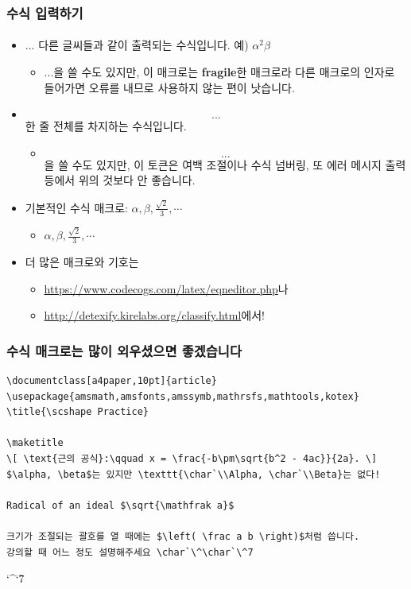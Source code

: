   \begin{frame}[fragile]
    \frametitle{수식 입력하기}
    \framesubtitle{}
    \begin{itemize}
      \item \texttt{$ ... $} 다른 글씨들과 같이 출력되는 수식입니다. 예) $\alpha^2\beta$
      \begin{itemize}
        \item \texttt{\( ... \)}을 쓸 수도 있지만, 이 매크로는 \textbf{fragile}한 매크로라 다른 매크로의 인자로 들어가면 오류를 내므로 사용하지 않는 편이 낫습니다.
      \end{itemize}
      \item \texttt{\[ ... \]} 한 줄 전체를 차지하는 수식입니다.
      \begin{itemize}
        \item \texttt{$$ ... $$}을 쓸 수도 있지만, 이 토큰은 여백 조절이나 수식 넘버링, 또 에러 메시지 출력 등에서 위의 것보다 안 좋습니다.
      \end{itemize}
      \item 기본적인 수식 매크로: \texttt{$ \alpha, \beta, \frac{\sqrt{2}}{3}, \cdots $}
      \begin{itemize}
        \item $ \alpha, \beta, \frac{\sqrt{2}}{3}, \cdots $
      \end{itemize}
      \item 더 많은 매크로와 기호는
      \begin{itemize}
        \item \url{https://www.codecogs.com/latex/eqneditor.php}나 
        \item \url{http://detexify.kirelabs.org/classify.html}에서!
      \end{itemize}
    \end{itemize}
  \end{frame}
  
  \begin{frame}[fragile]
    \frametitle{수식 매크로는 많이 외우셨으면 좋겠습니다}
    \begin{verbatim}
\documentclass[a4paper,10pt]{article}
\usepackage{amsmath,amsfonts,amssymb,mathrsfs,mathtools,kotex}
\title{\scshape Practice}

\maketitle
\[ \text{근의 공식}:\qquad x = \frac{-b\pm\sqrt{b^2 - 4ac}}{2a}. \]
$\alpha, \beta$는 있지만 \texttt{\char`\\Alpha, \char`\\Beta}는 없다!

Radical of an ideal $\sqrt{\mathfrak a}$

크기가 조절되는 괄호를 열 때에는 $\left( \frac a b \right)$처럼 씁니다.
강의할 때 어느 정도 설명해주세요 \char`\^\char`\^7

    \end{verbatim}
    \char`\^\char`\^7
  \end{frame}


